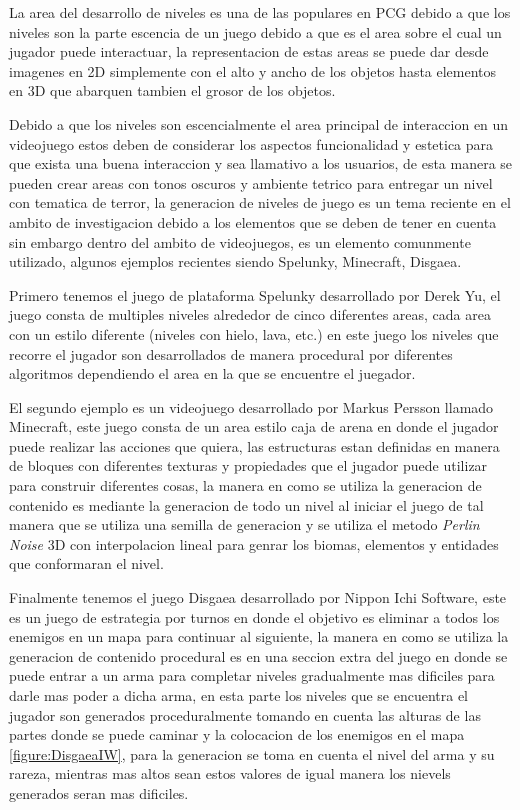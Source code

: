 La area del desarrollo de niveles es una de las populares en PCG debido a que
los niveles son la parte escencia de un juego debido a que es el area sobre el
cual un jugador puede interactuar, la representacion de estas areas se puede dar
desde imagenes en 2D simplemente con el alto y ancho de los objetos hasta
elementos en 3D que abarquen tambien el grosor de los objetos.

Debido a que los niveles son escencialmente el area principal de interaccion en
un videojuego estos deben de considerar los aspectos funcionalidad y estetica
para que exista una buena interaccion y sea llamativo a los usuarios, de esta
manera se pueden crear areas con tonos oscuros y ambiente tetrico para entregar
un nivel con tematica de terror, la generacion de niveles de juego es un tema
reciente en el ambito de investigacion debido a los elementos que se deben de
tener en cuenta sin embargo dentro del ambito de videojuegos, es un elemento
comunmente utilizado, algunos ejemplos recientes siendo Spelunky, Minecraft,
Disgaea.

Primero tenemos el juego de plataforma Spelunky desarrollado por Derek Yu, el
juego consta de multiples niveles alrededor de cinco diferentes areas, cada area
con un estilo diferente (niveles con hielo, lava, etc.) en este juego los niveles
que recorre el jugador son desarrollados de manera procedural por diferentes
algoritmos dependiendo el area en la que se encuentre el juegador.

El segundo ejemplo es un videojuego desarrollado por Markus Persson llamado
Minecraft, este juego consta de un area estilo caja de arena en donde el jugador
puede realizar las acciones que quiera, las estructuras estan definidas en
manera de bloques con diferentes texturas y propiedades que el jugador puede
utilizar para construir diferentes cosas, la manera en como se utiliza la
generacion de contenido es mediante la generacion de todo un nivel al iniciar el
juego de tal manera que se utiliza una semilla de generacion y se utiliza el
metodo \textit{Perlin Noise} 3D con interpolacion lineal para genrar los biomas,
elementos y entidades que conformaran el nivel.

Finalmente tenemos el juego Disgaea desarrollado por Nippon Ichi Software, este
es un juego de estrategia por turnos en donde el objetivo es eliminar a todos
los enemigos en un mapa para continuar al siguiente, la manera en como se
utiliza la generacion de contenido procedural es en una seccion extra del juego
en donde se puede entrar a un arma para completar niveles gradualmente mas
dificiles para darle mas poder a dicha arma, en esta parte los niveles que se
encuentra el jugador son generados proceduralmente tomando en cuenta las alturas
de las partes donde se puede caminar y la colocacion de los enemigos en el mapa
\ref{figure:DisgaeaIW}, para la generacion se toma en cuenta el nivel del arma y
su rareza, mientras mas altos sean estos valores de igual manera los nievels
generados seran mas dificiles.

